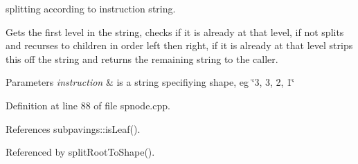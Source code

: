splitting according to instruction string. 

\-Gets the first level in the string, checks if it is already at that level, if not splits and recurses to children in order left then right, if it is already at that level strips this off the string and returns the remaining string to the caller. 
\begin{DoxyParams}{\-Parameters}
{\em instruction} & is a string specifiying shape, eg \char`\"{}3, 3, 2, 1\char`\"{} \\
\hline
\end{DoxyParams}


\-Definition at line 88 of file spnode.\-cpp.



\-References subpavings\-::is\-Leaf().



\-Referenced by split\-Root\-To\-Shape().


